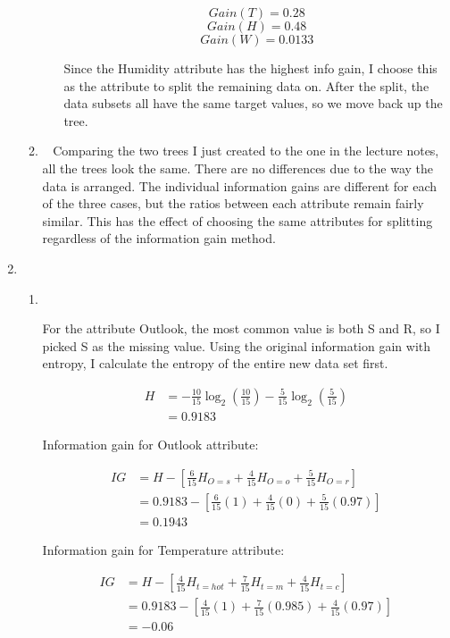 \documentclass[12pt, fullpage,letterpaper]{article}
\begin{document}
\begin{enumerate}
\begin{enumerate}
\begin{enumerate}
		\[
			Gain(T) = 0.28
		\]
		\[
			Gain(H) = 0.48
		\]
		\[
			Gain(W) = 0.0133
		\]
		
		Since the Humidity attribute has the highest info gain, I choose this as the attribute to split the remaining data on. After the split, the data subsets all have the same target values, so we move back up the tree.
		
		
		
	\end{enumerate}

\item~ Comparing the two trees I just created to the one in the lecture notes, all the trees look the same. There are no differences due to the way the data is arranged. The individual information gains are different for each of the three cases, but the ratios between each attribute remain fairly similar. This has the effect of choosing the same attributes for splitting regardless of the information gain method.

\end{enumerate}

\pagebreak


\item~
\begin{enumerate}
\item~

		For the attribute Outlook, the most common value is both S and R, so I picked S as the missing value. Using the original information gain with entropy, I calculate the entropy of the entire new data set first.
		
		\[
			\begin{split}
				H &= -\frac{10}{15} \log_2 (\frac{10}{15}) - \frac{5}{15} \log_2 (\frac{5}{15})
					\\
					&= 0.9183			
			\end{split}
		\]
		
		Information gain for Outlook attribute:
		
		
		\[
			\begin{split}
				IG &= H - [\frac{6}{15}H_{O=s} + \frac{4}{15} H_{O=o} + \frac{5}{15} H_{O=r}]
					\\
					&= 0.9183	 - [\frac{6}{15}(1) + \frac{4}{15}(0) + \frac{5}{15} (0.97)]	
					\\
					&= 	0.1943
			\end{split}
		\]
		
		Information gain for Temperature attribute:
		
		
		\[
			\begin{split}
				IG &= H - [\frac{4}{15}H_{t=hot} + \frac{7}{15} H_{t=m} + \frac{4}{15} H_{t=c}]
					\\
					&= 0.9183	 - [\frac{4}{15}(1) + \frac{7}{15}(0.985) + \frac{4}{15} (0.97)]	
					\\
					&= 	-0.06
			\end{split}
		\]
		

\end{enumerate}
\end{enumerate}
\end{document}
